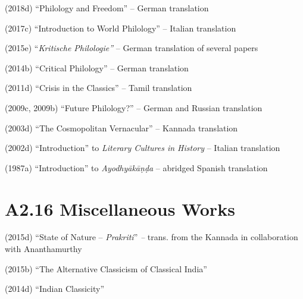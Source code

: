 \item (2018d) “Philology and Freedom” – German translation

 \item (2017c) “Introduction to World Philology” – Italian translation

 \item (2015e) “\textit{Kritische Philologie”} – German translation of several papers

 \item (2014b) “Critical Philology” – German translation

 \item (2011d) “Crisis in the Classics” – Tamil translation

 \item (2009c, 2009b) “Future Philology?” – German and Russian translation

 \item (2003d) “The Cosmopolitan Vernacular” – Kannada translation

 \item (2002d) “Introduction” to \textit{Literary Cultures in History} – Italian translation

 \item (1987a) “Introduction” to \textit{Ayodhyākāṇḍa} – abridged Spanish translation



\section*{A2.16 Miscellaneous Works}

\item (2015d) “State of Nature – \textit{Prakriti}”\textit{ –} trans. from the Kannada in collaboration with Ananthamurthy

 \item (2015b) “The Alternative Classicism of Classical India”

 \item (2014d) “Indian Classicity”

